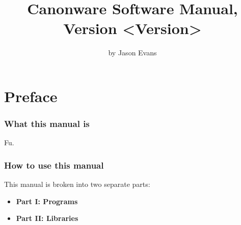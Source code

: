 \documentclass[10pt,titlepage]{book}
\title{Canonware Software Manual, Version <Version>}
\author{by Jason Evans}
\newcommand{\clearemptydoublepage}{\newpage{\pagestyle{empty}\cleardoublepage}}
\begin{document}
\maketitle
\clearemptydoublepage

\pagestyle{fancy}


\tableofcontents
\clearemptydoublepage





\chapter{Preface}

\subsection*{What this manual is}
Fu.

\subsection*{How to use this manual}
This manual is broken into two separate parts:

\begin{itemize}
\item{\bf{Part I}: Programs}
\item{\bf{Part II}: Libraries}
\end{itemize}

%
%
\lhead[\bfseries\thepage]{\bfseries\rightmark}
\pagestyle{fancy}
\clearemptydoublepage
\end{document}

